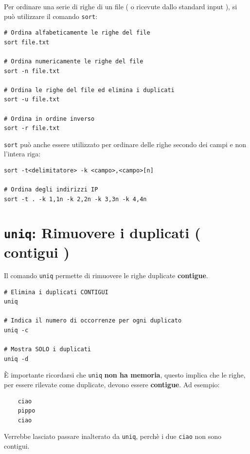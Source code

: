 \documentclass[a4paper]{report}
\newenvironment{info}{\begin{tcolorbox}[fonttitle=\sffamily\bfseries\large,title=Info,colframe=blue!75!white]}{\end{tcolorbox}}
\newenvironment{code}{\begin{tcolorbox}[size=small]}{\end{tcolorbox}}
\begin{document}
Per ordinare una serie di righe di un file ( o ricevute dallo standard input ), si può utilizzare il comando \texttt{sort}:

\begin{code}
\begin{lstlisting}
# Ordina alfabeticamente le righe del file
sort file.txt

# Ordina numericamente le righe del file
sort -n file.txt

# Ordina le righe del file ed elimina i duplicati
sort -u file.txt

# Ordina in ordine inverso
sort -r file.txt
\end{lstlisting}
\end{code}

\texttt{sort} può anche essere utilizzato per ordinare delle righe secondo dei campi e non l'intera riga:

\begin{code}
\begin{lstlisting}
sort -t<delimitatore> -k <campo>,<campo>[n]

# Ordina degli indirizzi IP
sort -t . -k 1,1n -k 2,2n -k 3,3n -k 4,4n
\end{lstlisting}
\end{code}

\section{\texttt{uniq}: Rimuovere i duplicati ( contigui )}

Il comando \texttt{uniq} permette di rimuovere le righe duplicate \textbf{contigue}. 

\begin{code}
	\begin{lstlisting}
# Elimina i duplicati CONTIGUI
uniq

# Indica il numero di occorrenze per ogni duplicato
uniq -c

# Mostra SOLO i duplicati
uniq -d
	\end{lstlisting}
\end{code}

\begin{info}
	È importante ricordarsi che \texttt{uniq} \textbf{non ha memoria}, questo implica che le righe, per essere rilevate come duplicate, devono essere \textbf{contigue}. Ad esempio:
	\begin{lstlisting}
	ciao
	pippo
	ciao
	\end{lstlisting}
	
	Verrebbe lasciato passare inalterato da \texttt{uniq}, perchè i due \texttt{ciao} non sono contigui.
\end{info}
\end{document}
